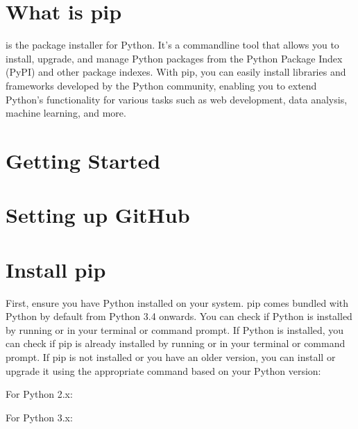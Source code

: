 \documentclass[letterpaper,10pt,english]{sphinxmanual}
\begin{document}
\section{What is pip}
\label{\detokenize{Other/Sphinx_and_HTML_Web_Publishing:what-is-pip}}
\sphinxAtStartPar
{} is the package installer for Python. It’s a command\sphinxhyphen{}line tool that allows you to install, upgrade, and manage Python packages from the Python Package Index (PyPI) and other package indexes.
With pip, you can easily install libraries and frameworks developed by the Python community, enabling you to extend Python’s functionality for various tasks such as web development, data analysis, machine learning, and more.


\section{Getting Started}
\label{\detokenize{Other/Sphinx_and_HTML_Web_Publishing:getting-started}}

\section{Setting up GitHub}
\label{\detokenize{Other/Sphinx_and_HTML_Web_Publishing:setting-up-github}}

\section{Install pip}
\label{\detokenize{Other/Sphinx_and_HTML_Web_Publishing:install-pip}}
\sphinxAtStartPar
{}
First, ensure you have Python installed on your system. pip comes bundled with Python by default from Python 3.4 onwards.
You can check if Python is installed by running  or  in your terminal or command prompt.
If Python is installed, you can check if pip is already installed by running  or  in your terminal or command prompt.
If pip is not installed or you have an older version, you can install or upgrade it using the appropriate command based on your Python version:

\sphinxAtStartPar
For Python 2.x:

\sphinxAtStartPar
For Python 3.x:
\end{document}
